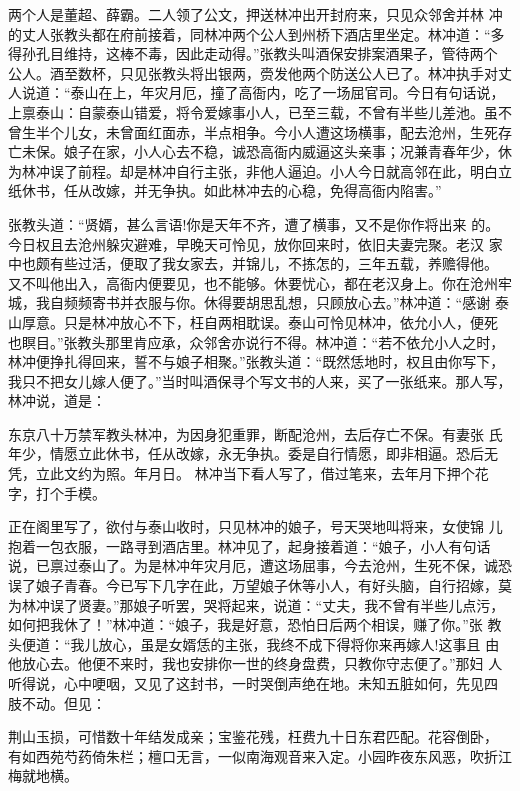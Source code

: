 两个人是董超、薛霸。二人领了公文，押送林冲出开封府来，只见众邻舍并林
冲的丈人张教头都在府前接着，同林冲两个公人到州桥下酒店里坐定。林冲道：“多
得孙孔目维持，这棒不毒，因此走动得。”张教头叫酒保安排案酒果子，管待两个
公人。酒至数杯，只见张教头将出银两，赍发他两个防送公人已了。林冲执手对丈
人说道：“泰山在上，年灾月厄，撞了高衙内，吃了一场屈官司。今日有句话说，
上禀泰山：自蒙泰山错爱，将令爱嫁事小人，已至三载，不曾有半些儿差池。虽不
曾生半个儿女，未曾面红面赤，半点相争。今小人遭这场横事，配去沧州，生死存
亡未保。娘子在家，小人心去不稳，诚恐高衙内威逼这头亲事；况兼青春年少，休
为林冲误了前程。却是林冲自行主张，非他人逼迫。小人今日就高邻在此，明白立
纸休书，任从改嫁，并无争执。如此林冲去的心稳，免得高衙内陷害。”

张教头道：“贤婿，甚么言语!你是天年不齐，遭了横事，又不是你作将出来
的。今日权且去沧州躲灾避难，早晚天可怜见，放你回来时，依旧夫妻完聚。老汉
家中也颇有些过活，便取了我女家去，并锦儿，不拣怎的，三年五载，养赡得他。
又不叫他出入，高衙内便要见，也不能够。休要忧心，都在老汉身上。你在沧州牢
城，我自频频寄书并衣服与你。休得要胡思乱想，只顾放心去。”林冲道：“感谢
泰山厚意。只是林冲放心不下，枉自两相耽误。泰山可怜见林冲，依允小人，便死
也瞑目。”张教头那里肯应承，众邻舍亦说行不得。林冲道：“若不依允小人之时，
林冲便挣扎得回来，誓不与娘子相聚。”张教头道：“既然恁地时，权且由你写下，
我只不把女儿嫁人便了。”当时叫酒保寻个写文书的人来，买了一张纸来。那人写，
林冲说，道是：

东京八十万禁军教头林冲，为因身犯重罪，断配沧州，去后存亡不保。有妻张
氏年少，情愿立此休书，任从改嫁，永无争执。委是自行情愿，即非相逼。恐后无
凭，立此文约为照。年月日。
林冲当下看人写了，借过笔来，去年月下押个花字，打个手模。

正在阁里写了，欲付与泰山收时，只见林冲的娘子，号天哭地叫将来，女使锦
儿抱着一包衣服，一路寻到酒店里。林冲见了，起身接着道：“娘子，小人有句话
说，已禀过泰山了。为是林冲年灾月厄，遭这场屈事，今去沧州，生死不保，诚恐
误了娘子青春。今已写下几字在此，万望娘子休等小人，有好头脑，自行招嫁，莫
为林冲误了贤妻。”那娘子听罢，哭将起来，说道：“丈夫，我不曾有半些儿点污，
如何把我休了！”林冲道：“娘子，我是好意，恐怕日后两个相误，赚了你。”张
教头便道：“我儿放心，虽是女婿恁的主张，我终不成下得将你来再嫁人!这事且
由他放心去。他便不来时，我也安排你一世的终身盘费，只教你守志便了。”那妇
人听得说，心中哽咽，又见了这封书，一时哭倒声绝在地。未知五脏如何，先见四
肢不动。但见：

荆山玉损，可惜数十年结发成亲；宝鉴花残，枉费九十日东君匹配。花容倒卧，
有如西苑芍药倚朱栏；檀口无言，一似南海观音来入定。小园昨夜东风恶，吹折江
梅就地横。

